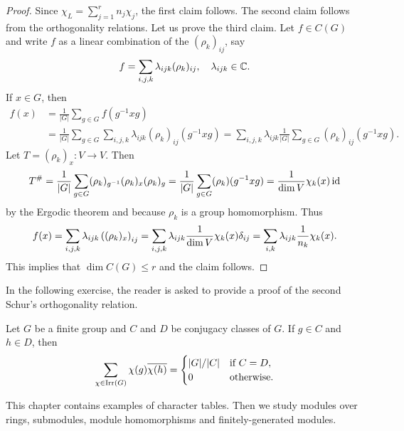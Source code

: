 \begin{proof}
    Since $\chi_L=\sum_{j=1}^rn_j\chi_j$, the first claim follows. 
    The second claim follows from the orthogonality relations. Let us prove the third claim. Let $f\in C(G)$ and write $f$ 
    as a linear combination of the $(\rho_k)_{ij}$, say
    \[
    f=\sum_{i,j,k}\lambda_{ijk}(\rho_k)_{ij},\quad\lambda_{ijk}\in\mathbb{C}.
    \]
    If $x\in G$, then 
    \begin{align*}
    f(x)&=\frac{1}{|G|}\sum_{g\in G}f(g^{-1}xg)\\
    &=\frac{1}{|G|}\sum_{g\in G}\sum_{i,j,k}\lambda_{ijk}(\rho_k)_{ij}(g^{-1}xg)
    =\sum_{i,j,k}\lambda_{ijk} \frac{1}{|G|}\sum_{g\in G}(\rho_k)_{ij}(g^{-1}xg). 
    \end{align*}
    Let $T=(\rho_k)_x\colon V\to V$. Then
    \[
    T^{\#}=\frac{1}{|G|}\sum_{g\in G}(\rho_k)_{g^{-1}}(\rho_k)_x(\rho_k)_g
    =\frac{1}{|G|}\sum_{g\in G}(\rho_k)(g^{-1}xg)
    =\frac{1}{\dim V}\chi_k(x)\operatorname{id}
    \]
    by the Ergodic theorem and because 
    $\rho_k$ is a group homomorphism. Thus 
    \[
    f(x)=\sum_{i,j,k}\lambda_{ijk} \left((\rho_k)_x\right)_{ij}
    =\sum_{i,j,k}\lambda_{ijk}\frac{1}{\dim V}\chi_k(x)\delta_{ij}
    =\sum_{i,k}\lambda_{ijk}\frac{1}{n_k}\chi_k(x).\qedhere 
    \]
    This implies that $\dim C(G)\leq r$ and the claim follows. 
\end{proof}

In the following exercise, the reader is asked to provide a proof of the second 
Schur's orthogonality relation. 

\begin{exercise}
    Let $G$ be a finite group and 
    $C$ and $D$ be conjugacy classes of $G$. If $g\in C$ and $h\in D$, then
    \[
    \sum_{\chi\in\operatorname{Irr}(G)}\chi(g)\overline{\chi(h)}=
    \begin{cases}
    |G|/|C| & \text{if $C=D$},\\
    0 & \text{otherwise}.
    \end{cases}
    \]
\end{exercise}


This chapter contains examples of character tables. Then we
study modules over rings, submodules, module homomorphisms
and finitely-generated modules. 

